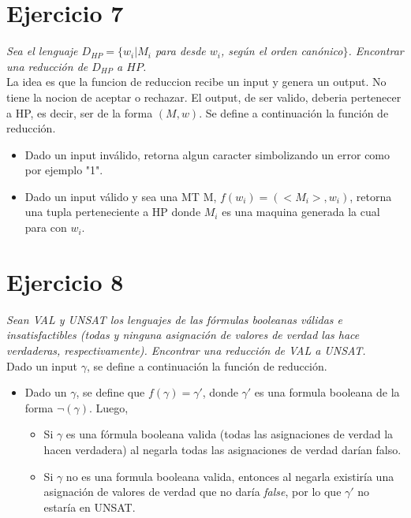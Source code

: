 \documentclass[lnbip]{svmultln}
\begin{document}
\section{Ejercicio 7}

\textit{Sea el lenguaje $D_{HP} = \{w_i | M_i$ para desde $w_{i}$, según el orden canónico$\}$. Encontrar una reducción de $D_{HP}$ a $HP$.} \\

La idea es que la funcion de reduccion recibe un input y genera un output. No tiene la nocion de aceptar o rechazar. El output, de ser valido, deberia pertenecer a HP, es decir, ser de la forma $(M, w)$. Se define a continuación la función de reducción.

\begin{itemize}
    \item Dado un input inválido, retorna algun caracter simbolizando un error como por ejemplo "1".
    \item Dado un input válido y sea una MT M, $f(w_{i}) = (<M_{i}>, w_{i})$, retorna una tupla perteneciente a HP donde $M_i$ es una maquina generada la cual para con $w_i$.
\end{itemize}

\section{Ejercicio 8}

\textit{Sean VAL y UNSAT los lenguajes de las fórmulas booleanas válidas e insatisfactibles (todas y ninguna asignación de valores de verdad las hace verdaderas, respectivamente). Encontrar una reducción de VAL a UNSAT.} \\

Dado un input $\gamma$, se define a continuación la función de reducción.

\begin{itemize}
    \item Dado un $\gamma$, se define que $f(\gamma) = \gamma '$, donde $\gamma '$ es una formula booleana de la forma $\neg (\gamma)$. Luego, 
    
    \begin{itemize}
        \item Si $\gamma$ es una fórmula booleana valida (todas las asignaciones de verdad la hacen verdadera) al negarla todas las asignaciones de verdad darían falso.
        
        \item Si $\gamma$ no es una formula booleana valida, entonces al negarla existiría una asignación de valores de verdad que no daría \textit{false}, por lo que $\gamma '$ no estaría en UNSAT.
    \end{itemize}
\end{itemize}
\end{document}
